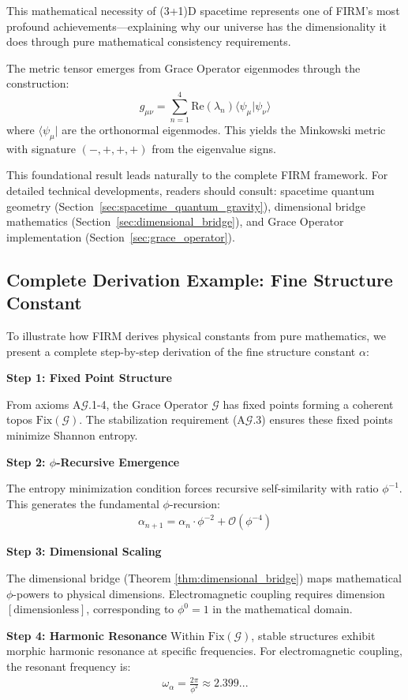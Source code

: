 \documentclass[12pt]{article}
\newcommand{\G}{\mathcal{G}}                %
\newcommand{\Fix}{\text{Fix}}               %
\begin{document}
This mathematical necessity of (3+1)D spacetime represents one of FIRM's most profound achievements—explaining why our universe has the dimensionality it does through pure mathematical consistency requirements.

The metric tensor emerges from Grace Operator eigenmodes through the construction:
$$g_{\mu\nu} = \sum_{n=1}^{4} \text{Re}(\lambda_n) \langle\psi_\mu|\psi_\nu\rangle$$
where $\langle\psi_\mu|$ are the orthonormal eigenmodes. This yields the Minkowski metric with signature $(-,+,+,+)$ from the eigenvalue signs.

This foundational result leads naturally to the complete FIRM framework. For detailed technical developments, readers should consult: spacetime quantum geometry (Section~\ref{sec:spacetime_quantum_gravity}), dimensional bridge mathematics (Section~\ref{sec:dimensional_bridge}), and Grace Operator implementation (Section~\ref{sec:grace_operator}).

\subsection{Complete Derivation Example: Fine Structure Constant}

To illustrate how FIRM derives physical constants from pure mathematics, we present a complete step-by-step derivation of the fine structure constant $\alpha$:

\textbf{Step 1: Fixed Point Structure}

From axioms A$\mathcal{G}$.1-4, the Grace Operator $\G$ has fixed points forming a coherent topos $\Fix(\G)$. The stabilization requirement (A$\mathcal{G}$.3) ensures these fixed points minimize Shannon entropy.

\textbf{Step 2: $\phi$-Recursive Emergence}

The entropy minimization condition forces recursive self-similarity with ratio $\phi^{-1}$. This generates the fundamental $\phi$-recursion:
\begin{align}
\alpha_{n+1} = \alpha_n \cdot \phi^{-2} + \mathcal{O}(\phi^{-4})
\end{align}

\textbf{Step 3: Dimensional Scaling}

The dimensional bridge (Theorem \ref{thm:dimensional_bridge}) maps mathematical $\phi$-powers to physical dimensions. Electromagnetic coupling requires dimension $[\text{dimensionless}]$, corresponding to $\phi^0 = 1$ in the mathematical domain.

\textbf{Step 4: Harmonic Resonance}
Within $\Fix(\G)$, stable structures exhibit morphic harmonic resonance at specific frequencies. For electromagnetic coupling, the resonant frequency is:
\begin{align}
\omega_{\alpha} = \frac{2\pi}{\phi^2} \approx 2.399...
\end{align}
\end{document}
